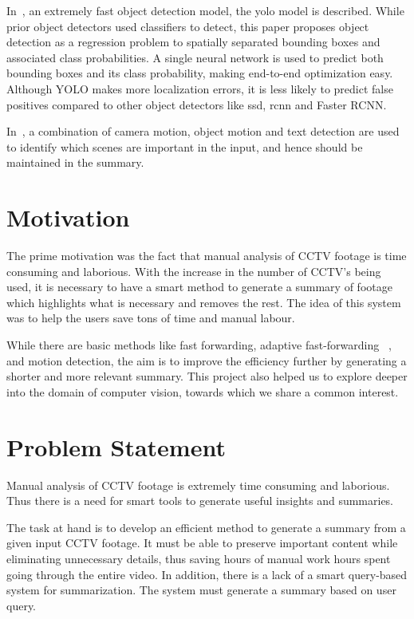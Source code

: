 In~\cite{redmon2016you}, an extremely fast object detection model, the
\gls{yolo} model is described. While prior object detectors used classifiers to
detect, this paper proposes object detection as a regression problem to
spatially separated bounding boxes and associated class probabilities. A single
neural network is used to predict both bounding boxes and its class probability,
making end-to-end optimization easy. Although YOLO makes more localization
errors, it is less likely to predict false positives compared to other object
detectors like \gls{ssd}, \gls{rcnn} and Faster RCNN.

In~\cite{smith1998video}, a combination of camera motion, object motion and
text detection are used to identify which scenes are important in the input, and
hence should be maintained in the summary.

\section{Motivation}

The prime motivation was the fact that manual analysis of CCTV footage is time
consuming and laborious. With the increase in the number of CCTV’s being used,
it is necessary to have a smart method to generate a summary of footage which
highlights what is necessary and removes the rest. The idea of this system was
to help the users save tons of time and manual labour.

While there are basic methods like fast forwarding, adaptive fast-forwarding~
\cite{petrovic2005adaptive}, and motion detection, the aim is to improve the
efficiency further by generating a shorter and more relevant summary. This
project also helped us to explore deeper into the domain of computer vision,
towards which we share a common interest.

\section{Problem Statement}

Manual analysis of CCTV footage is extremely time consuming and laborious. Thus
there is a need for smart tools to generate useful insights and summaries.

The task at hand is to develop an efficient method to generate a summary from a
given input CCTV footage. It must be able to preserve important content while
eliminating unnecessary details, thus saving hours of manual work hours spent
going through the entire video. In addition, there is a lack of a smart
query-based system for summarization. The system must generate a summary based
on user query.

